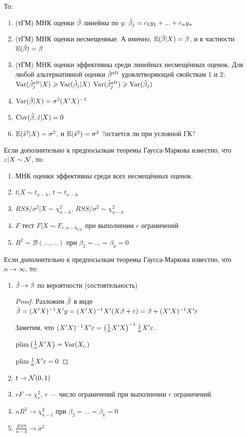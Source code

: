 \documentclass[12pt, a4paper]{article}
\begin{document}
То:

\begin{enumerate}
\item (тГМ) МНК оценки $\hat{\beta}$ линейны по $y$:
$\hat{\beta}_j=c_1 y_1 + ... + c_n y_n$
\item  (тГМ) МНК оценки несмещенные. А именно, $\mathbb{E}(\hat{\beta} |X )=\beta$, и в частности $\mathbb{E}(\hat{\beta})=\beta$
\item  (тГМ) МНК оценки эффективны среди линейных несмещённых оценок. Для любой альтернативной оценки $\hat{\beta}^{alt}$ удовлетворяющей свойствам 1 и 2:
$\operatorname{Var}(\hat{\beta}_j^{alt} | X)\geqslant \operatorname{Var}(\hat{\beta}_j | X)$
$\operatorname{Var}(\hat{\beta}_j^{alt} )\geqslant \operatorname{Var}(\hat{\beta}_j )$
\item  $\operatorname{Var}(\hat{\beta} | X )=\sigma^2 (X'X)^{-1}$
\item $\operatorname{Cov}(\hat{\beta},\hat{\varepsilon} | X)=0$
\item  $\mathbb{E}(\hat{s}^2 |X ) = \sigma^2$, и $\mathbb{E}(\hat{s}^2 ) = \sigma^2$ ?остается ли при условной ГК?
\end{enumerate}

Если дополнительно к предпосылкам теоремы Гаусса-Маркова известно, что $\varepsilon |X \sim \mathcal{N}$, то:

\begin{enumerate}
\item МНК оценки эффективны среди всех несмещённых оценок.
\item $t|X \sim t_{n-k}$, $t\sim t_{n-k}$
\item $RSS/\sigma^2 |X \sim \chi^2_{n-k}$, $RSS/\sigma^2 \sim \chi^2_{n-k}$
\item $F$ тест $F|X \sim F_{r, n-k_{UR}}$  при выполнении $r$ ограничений
\item $R^2 \sim \mathcal{B}(..., ...)$ при $\beta_2 = \ldots = \beta_k = 0$
\end{enumerate}

Если дополнительно к предпосылкам теоремы Гаусса-Маркова известно, что $n\to \infty$, то:

\begin{enumerate}
\item  $\hat{\beta} \to \beta$ по вероятности (состоятельность)

\begin{proof}
Разложим $\hat{\beta}$ в виде $\hat{\beta}=(X'X)^{-1}X'y=(X'X)^{-1}X'(X\beta+\varepsilon)=\beta+(X'X)^{-1}X'\varepsilon$

Заметим, что $(X'X)^{-1}X'\varepsilon=\left(\frac{1}{n}X'X\right)^{-1}\frac{1}{n}X'\varepsilon$.

$\operatorname*{plim} \left(\frac{1}{n}X'X\right)=\operatorname{Var}(X_{i.})$

$\operatorname*{plim} \frac{1}{n}X'\varepsilon=0$
\end{proof}

\item $t \to \mathcal{N}(0,1)$
\item $rF \to \chi^2_r$, $r$ — число ограничений при выполнении $r$ ограничений
\item $nR^2 \to \chi^2_{k-1}$ при $\beta_2 = \ldots = \beta_k = 0$
\item $\frac{RSS}{n-k} \to \sigma^2 $
\end{enumerate}
\end{document}
